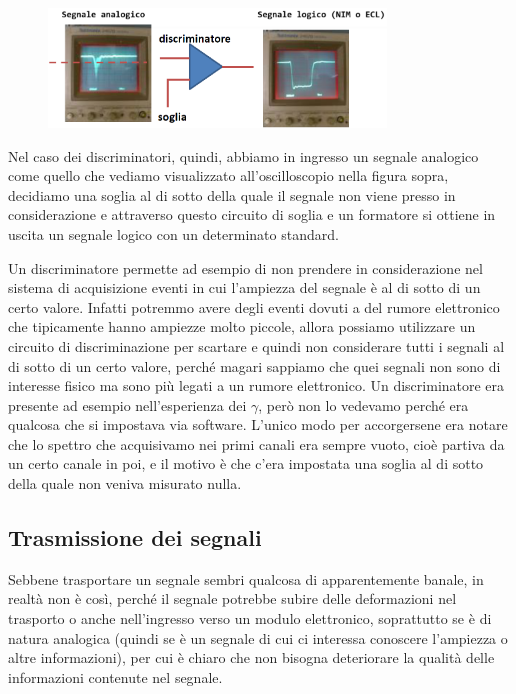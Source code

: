 \begin{figure}[H]
   \centering
   \includegraphics[width=0.8\textwidth]{immagini/segnale_discriminatore.png}
\end{figure}

Nel caso dei discriminatori, quindi, abbiamo in ingresso un segnale analogico come quello che vediamo visualizzato all'oscilloscopio nella figura sopra, decidiamo una soglia al di sotto della quale il segnale non viene presso in considerazione e attraverso questo circuito di soglia e un formatore si ottiene in uscita un segnale logico con un determinato standard.

Un discriminatore permette ad esempio di non prendere in considerazione nel sistema di acquisizione eventi in cui l'ampiezza del segnale è al di sotto di un certo valore. Infatti potremmo avere degli eventi dovuti a del rumore elettronico che tipicamente hanno ampiezze molto piccole, allora possiamo utilizzare un circuito di discriminazione per scartare e quindi non considerare tutti i segnali al di sotto di un certo valore, perché magari sappiamo che quei segnali non sono di interesse fisico ma sono più legati a un rumore elettronico. Un discriminatore era presente ad esempio nell'esperienza dei $\gamma$, però non lo vedevamo perché era qualcosa che si impostava via software. L'unico modo per accorgersene era notare che lo spettro che acquisivamo nei primi canali era sempre vuoto, cioè partiva da un certo canale in poi, e il motivo è che c'era impostata una soglia al di sotto della quale non veniva misurato nulla.

\subsection{Trasmissione dei segnali}

Sebbene trasportare un segnale sembri qualcosa di apparentemente banale, in realtà non è così, perché il segnale potrebbe subire delle deformazioni nel trasporto o anche nell'ingresso verso un modulo elettronico, soprattutto se è di natura analogica (quindi se è un segnale di cui ci interessa conoscere l'ampiezza o altre informazioni), per cui è chiaro che non bisogna deteriorare la qualità delle informazioni contenute nel segnale.

